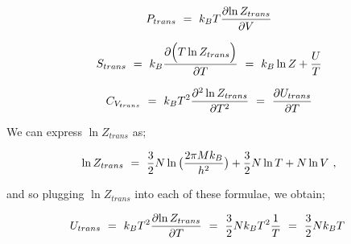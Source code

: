 \documentclass{article}
\begin{document}
\begin{equation} \label{eb-eq-256-92}
P_{trans} \hspace{0.125cm} = \hspace{0.125cm} k_B T \frac{\partial{\ln{Z_{trans}}}}{\partial{V}}
\end{equation}

\begin{equation} \label{eb-eq-256-93}
S_{trans} \hspace{0.125cm} = \hspace{0.125cm} k_B \frac{\partial{\Big( T \ln{Z_{trans}}} \Big)}{\partial{T}} \hspace{0.125cm} = \hspace{0.125cm} k_B \ln{Z} + \frac{U}{T}
\end{equation}

\begin{equation} \label{eb-eq-256-94}
C_{V_{trans}} \hspace{0.125cm} = \hspace{0.125cm} k_B T^2 \frac{\partial^2 \ln{Z_{trans}}}{\partial{T}^2} \hspace{0.125cm} = \hspace{0.125cm} \frac{\partial{U_{trans}}}{\partial{T}}
\end{equation}

We can express \begin{math} \ln{Z_{trans}} \end{math} as;

\begin{equation} \label{eb-eq-256-95}
\ln{Z_{trans}} \hspace{0.125cm} = \hspace{0.125cm} \frac{3}{2} N \ln \big( \frac{2 \pi M k_B}{h^2} \big) + \frac{3}{2} N \ln T  + N \ln V \hspace{0.125cm} , 
\end{equation}

and so plugging \begin{math} \ln{Z_{trans}} \end{math} into each of these formulae, we obtain;

\begin{equation} \label{eb-eq-256-96}
U_{trans} \hspace{0.125cm} = \hspace{0.125cm} k_B T^2 \frac{\partial{\ln{Z_{trans}}}}{\partial{T}} \hspace{0.125cm} = \hspace{0.125cm} \frac{3}{2} N k_B T^2 \frac{1}{T} \hspace{0.125cm} = \hspace{0.125cm} \frac{3}{2} N k_B T \hspace{0.125cm}
\end{equation}
\end{document}
